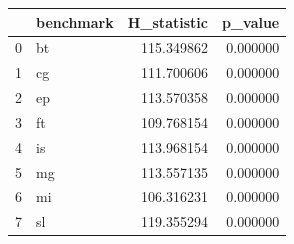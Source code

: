 \begin{tabular}{llrr}
\toprule
 & benchmark & H_statistic & p_value \\
\midrule
0 & bt & 115.349862 & 0.000000 \\
1 & cg & 111.700606 & 0.000000 \\
2 & ep & 113.570358 & 0.000000 \\
3 & ft & 109.768154 & 0.000000 \\
4 & is & 113.968154 & 0.000000 \\
5 & mg & 113.557135 & 0.000000 \\
6 & mi & 106.316231 & 0.000000 \\
7 & sl & 119.355294 & 0.000000 \\
\bottomrule
\end{tabular}
